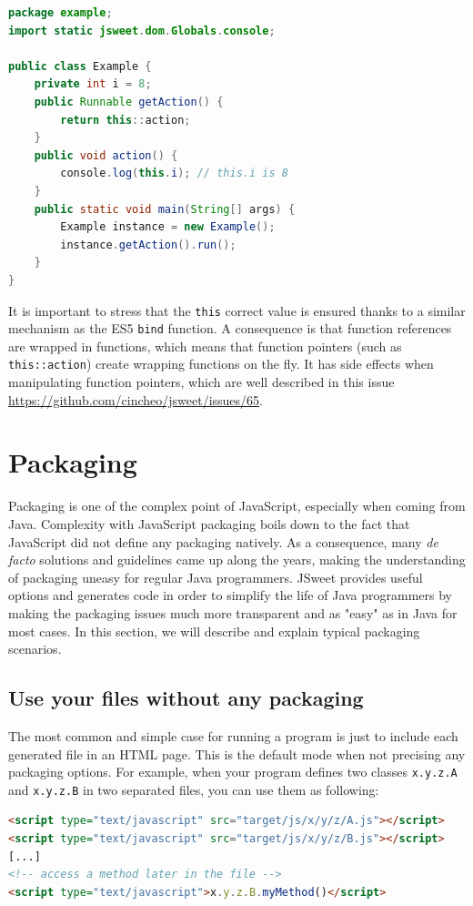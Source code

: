 \documentclass[a4paper]{report}
\begin{document}
\begin{lstlisting}[language=Java]
package example;
import static jsweet.dom.Globals.console;

public class Example {
	private int i = 8;
	public Runnable getAction() {
		return this::action;
	}
	public void action() {
		console.log(this.i); // this.i is 8
	}
	public static void main(String[] args) {
		Example instance = new Example();
		instance.getAction().run();
	}
}
\end{lstlisting}

It is important to stress that the \texttt{this} correct value is ensured thanks to a similar mechanism as the ES5 \texttt{bind} function. A consequence is that 
function references are wrapped in functions, which means that function pointers (such as \texttt{this::action}) create wrapping functions on the fly. It has side effects when manipulating function pointers, which are well described in this issue \url{https://github.com/cincheo/jsweet/issues/65}.

\chapter{Packaging}
\label{packaging}

Packaging is one of the complex point of JavaScript, especially when coming from Java. Complexity with JavaScript packaging boils down to the fact that JavaScript did not define any packaging natively. As a consequence, many \emph{de facto} solutions and guidelines came up along the years, making the understanding of packaging uneasy for regular Java programmers. JSweet provides useful options and generates code in order to simplify the life of Java programmers by making the packaging issues much more transparent and as "easy" as in Java for most cases. In this section, we will describe and explain typical packaging scenarios.

\section{Use your files without any packaging}

The most common and simple case for running a program is just to include each generated file in an HTML page. This is the default mode when not precising any packaging options. For example, when your program defines two classes \texttt{x.y.z.A} and \texttt{x.y.z.B} in two separated files, you can use them as following:

\begin{lstlisting}[language=html]
<script type="text/javascript" src="target/js/x/y/z/A.js"></script>
<script type="text/javascript" src="target/js/x/y/z/B.js"></script>
[...]
<!-- access a method later in the file -->
<script type="text/javascript">x.y.z.B.myMethod()</script>
\end{lstlisting}
\end{document}
